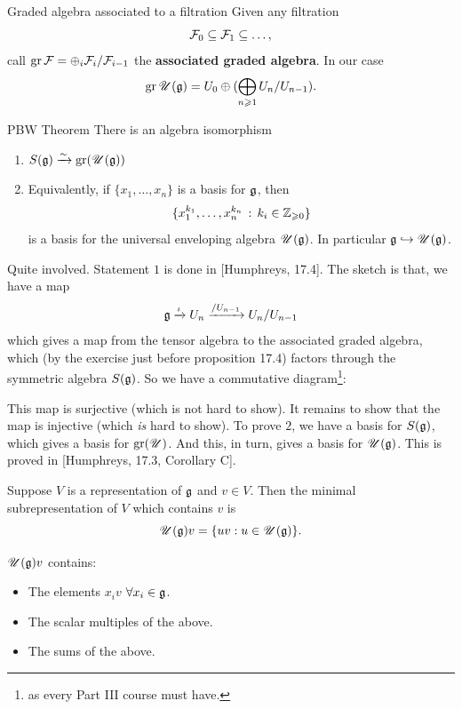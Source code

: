 \documentclass{article}
\begin{document}
\begin{fancydefine}{Graded algebra associated to a filtration}
    Given any filtration \[\mathcal{F}_{0} \subseteq \mathcal{F}_{1} \subseteq \dots, \] call $\operatorname{gr} \mathcal{F} = \oplus_{i} \mathcal{F}_{i}/ \mathcal{F}_{i-1}$ the \textbf{associated graded algebra}. In our case \[ \operatorname{gr} \mathscr{U}(\mathfrak{g}) = U_{0} \oplus (\bigoplus_{n \geqslant 1} U_{n}/U_{n-1}).\]
\end{fancydefine}
\begin{fancythm}{PBW Theorem}
    There is an algebra isomorphism \begin{enumerate}
        \item $S(\mathfrak{g}) \xrightarrow{\sim} \operatorname{gr}(\mathscr{U}(\mathfrak{g}))$
        \item Equivalently, if $\{x_{1}, \dots, x_{n}\}$ is a basis for $\mathfrak{g}$, then \[ \{x_{1}^{k_{1}},\dots,x_{n}^{k_{n}} \, : \, k_{i} \in \mathbb{Z}_{\geqslant 0}\}\] is a basis for the universal enveloping algebra $\mathscr{U}(\mathfrak{g})$. In particular $\mathfrak{g} \hookrightarrow \mathscr{U}(\mathfrak{g})$.
    \end{enumerate}
\end{fancythm}
\proof Quite involved. Statement $1$ is done in [Humphreys, 17.4]. The sketch is that, we have a map \[ \mathfrak{g} \xrightarrow{\iota}U_{n} \xrightarrow{/U_{n-1}} U_{n}/U_{n-1}\] which gives a map from the tensor algebra to the associated graded algebra, which (by the exercise just before proposition 17.4) factors through the symmetric algebra $S(\mathfrak{g})$. So we have a commutative diagram\footnote{as every Part III course must have.}: \begin{center}
\end{center}
This map is surjective (which is not hard to show). It remains to show that the map is injective (which \textit{is} hard to show).\gap 
To prove $2$, we have a basis for $S(\mathfrak{g})$, which gives a basis for $\operatorname{gr}(\mathscr{U})$. And this, in turn, gives a basis for $\mathscr{U}(\mathfrak{g})$. This is proved in [Humphreys, 17.3, Corollary C]. \endproof
\begin{fancylem}{}
    Suppose $V$ is a representation of $\mathfrak{g}$ and $v \in V$. Then the minimal subrepresentation of $V$ which contains $v$ is \[ \mathscr{U}(\mathfrak{g})v = \{ uv : u \in \mathscr{U}(\mathfrak{g})\}.  \]
\end{fancylem}
\proof $\mathscr{U}(\mathfrak{g})v$ contains: \begin{itemize}
    \item The elements $x_{i}v$ $\forall x_{i} \in \mathfrak{g}$.
    \item The scalar multiples of the above.
    \item The sums of the above.
\end{itemize}
\end{document}
